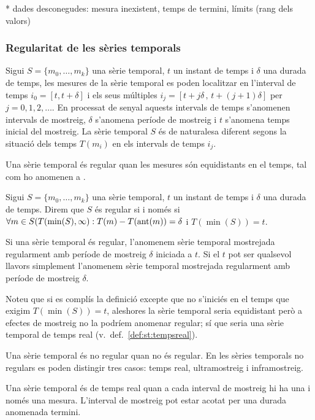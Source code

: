 * dades desconegudes: mesura inexistent, temps de termini, límits (rang dels valors)


\subsubsection{Regularitat de les sèries temporals} 


Sigui $S=\{m_0,\ldots,m_k\}$ una sèrie temporal, $t$ un instant de
temps i $\delta$ una durada de temps, les mesures de la sèrie temporal
es poden localitzar en l'interval de temps $i_0=[t,t+\delta]$ i els
seus múltiples $i_j=[t+j\delta \,,\, t+(j+1)\delta]$ per $j=0,1,2,\ldots$.
En processat de senyal aquests intervals de temps s'anomenen intervals
de mostreig, $\delta$ s'anomena període de mostreig i $t$ s'anomena
temps inicial del mostreig.  La sèrie temporal $S$ és de naturalesa
diferent segons la situació dels temps $T(m_i)$ en els intervals de
temps $i_j$.

Una sèrie temporal és regular quan les mesures són equidistants en el
temps, tal com ho anomenen a \cite{last:hetland}.

\begin{definition}
  \label{def:st:regular}
  Sigui $S=\{m_0,\ldots,m_k\}$ una sèrie temporal, $t$ un instant de
  temps i $\delta$ una durada de temps. Direm que $S$ és regular si i
  només si $\forall m \in S(T(\min(S),\infty):T(m) - T(\operatorname*{ant}(m)) =
  \delta$ i $T(\min(S))=t$.
\end{definition}

Si una sèrie temporal és regular, l'anomenem sèrie temporal mostrejada
regularment amb període de mostreig $\delta$ iniciada a $t$. Si el $t$
pot ser qualsevol llavors simplement l'anomenem sèrie temporal
mostrejada regularment amb període de mostreig $\delta$.

Noteu que si es complís
la definició excepte que no s'iniciés en el temps que exigim
$T(\min(S))=t$, aleshores la sèrie temporal seria equidistant però a
efectes de mostreig no la podríem anomenar regular; sí que seria una
sèrie temporal de temps real (v.\ def.~\ref{def:st:tempsreal}).


Una sèrie temporal és no regular quan no és regular. 
En les sèries temporals no regulars es poden distingir tres casos: temps real, ultramostreig i inframostreig.

Una sèrie temporal és de temps real quan a cada interval de mostreig hi ha una i només una mesura. L'interval de mostreig pot estar acotat per una durada anomenada termini.

